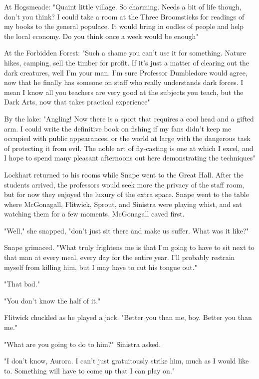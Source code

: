 At Hogsmeade: "Quaint little village. So charming. Needs a bit of life though, don't you think? I could take a room at the Three Broomsticks for readings of my books to the general populace. It would bring in oodles of people and help the local economy. Do you think once a week would be enough{\el}"

At the Forbidden Forest: "Such a shame you can't use it for something. Nature hikes, camping, sell the timber for profit. If it's just a matter of clearing out the dark creatures, well I'm your man. I'm sure Professor Dumbledore would agree, now that he finally has someone on staff who really understands dark forces. I mean I know all you teachers are very good at the subjects you teach, but the Dark Arts, now that takes practical experience{\el}"

By the lake: "Angling! Now there is a sport that requires a cool head and a gifted arm. I could write the definitive book on fishing if my fans didn't keep me occupied with public appearances, or the world at large with the dangerous task of protecting it from evil. The noble art of fly-casting is one at which I excel, and I hope to spend many pleasant afternoons out here demonstrating the techniques{\el}"

Lockhart returned to his rooms while Snape went to the Great Hall. After the students arrived, the professors would seek more the privacy of the staff room, but for now they enjoyed the luxury of the extra space. Snape went to the table where McGonagall, Flitwick, Sprout, and Sinistra were playing whist, and sat watching them for a few moments. McGonagall caved first.

"Well," she snapped, "don't just sit there and make us suffer. What was it like?"

Snape grimaced. "What truly frightens me is that I'm going to have to sit next to that man at every meal, every day for the entire year. I'll probably restrain myself from killing him, but I may have to cut his tongue out."

"That bad."

"You don't know the half of it."

Flitwick chuckled as he played a jack. "Better you than me, boy. Better you than me."

"What are you going to do to him?" Sinistra asked.

"I don't know, Aurora. I can't just gratuitously strike him, much as I would like to. Something will have to come up that I can play on."

